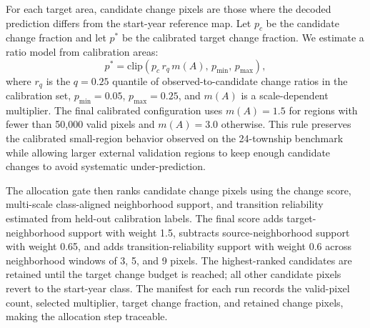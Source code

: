 \documentclass{article}
\begin{document}
For each target area, candidate change pixels are those where the decoded prediction differs from the start-year reference map. Let $p_c$ be the candidate change fraction and let $p^\ast$ be the calibrated target change fraction. We estimate a ratio model from calibration areas:
\begin{equation}
p^\ast = \mathrm{clip}\left(p_c \, r_q \, m(A),\, p_{\min},\, p_{\max}\right),
\end{equation}
where $r_q$ is the $q=0.25$ quantile of observed-to-candidate change ratios in the calibration set, $p_{\min}=0.05$, $p_{\max}=0.25$, and $m(A)$ is a scale-dependent multiplier. The final calibrated configuration uses $m(A)=1.5$ for regions with fewer than 50{,}000 valid pixels and $m(A)=3.0$ otherwise. This rule preserves the calibrated small-region behavior observed on the 24-township benchmark while allowing larger external validation regions to keep enough candidate changes to avoid systematic under-prediction.

The allocation gate then ranks candidate change pixels using the change score, multi-scale class-aligned neighborhood support, and transition reliability estimated from held-out calibration labels. The final score adds target-neighborhood support with weight 1.5, subtracts source-neighborhood support with weight 0.65, and adds transition-reliability support with weight 0.6 across neighborhood windows of 3, 5, and 9 pixels. The highest-ranked candidates are retained until the target change budget is reached; all other candidate pixels revert to the start-year class. The manifest for each run records the valid-pixel count, selected multiplier, target change fraction, and retained change pixels, making the allocation step traceable.
\end{document}
